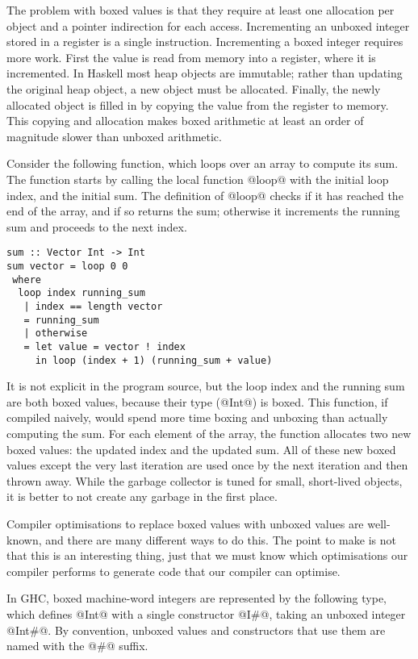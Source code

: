 The problem with boxed values is that they require at least one allocation per object and a pointer indirection for each access.
Incrementing an unboxed integer stored in a register is a single instruction.
Incrementing a boxed integer requires more work.
First the value is read from memory into a register, where it is incremented.
In Haskell most heap objects are immutable; rather than updating the original heap object, a new object must be allocated.
Finally, the newly allocated object is filled in by copying the value from the register to memory.
This copying and allocation makes boxed arithmetic at least an order of magnitude slower than unboxed arithmetic.

Consider the following function, which loops over an array to compute its sum.
The function starts by calling the local function @loop@ with the initial loop index, and the initial sum.
The definition of @loop@ checks if it has reached the end of the array, and if so returns the sum; otherwise it increments the running sum and proceeds to the next index.

\begin{lstlisting}
sum :: Vector Int -> Int
sum vector = loop 0 0
 where
  loop index running_sum
   | index == length vector
   = running_sum
   | otherwise
   = let value = vector ! index
     in loop (index + 1) (running_sum + value)
\end{lstlisting}

It is not explicit in the program source, but the loop index and the running sum are both boxed values, because their type (@Int@) is boxed.
This function, if compiled naively, would spend more time boxing and unboxing than actually computing the sum.
For each element of the array, the function allocates two new boxed values: the updated index and the updated sum.
All of these new boxed values except the very last iteration are used once by the next iteration and then thrown away.
While the garbage collector is tuned for small, short-lived objects, it is better to not create any garbage in the first place.

Compiler optimisations to replace boxed values with unboxed values are well-known, and there are many different ways to do this.
The point to make is not that this is an interesting thing, just that we must know which optimisations our compiler performs to generate code that our compiler can optimise.

In GHC, boxed machine-word integers are represented by the following type, which defines @Int@ with a single constructor @I#@, taking an unboxed integer @Int#@. By convention, unboxed values and constructors that use them are named with the @#@ suffix.

